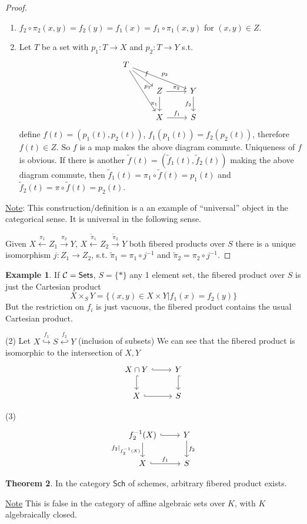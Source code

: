 \documentclass[11pt]{article}
\theoremstyle{definition}
\newtheorem{thm}{Theorem}[section]
\newtheorem{ex}[thm]{Example}
\newcommand{\calc}{{\cal C}}
\newcommand{\lrta}{\longrightarrow}
\newcommand{\inj}{\hookrightarrow}
\begin{document}
\begin{proof}
\ \begin{enumerate}[label=(\arabic*)]
\item $f_2\circ \pi_2(x,y)=f_2(y)=f_1(x)=f_1\circ \pi_1(x,y)$ for $(x,y)\in Z$.
\item Let $T$ be a set with $p_1:T\lrta X$ and $p_2:T\lrta Y$ s.t. $$\begin{tikzcd}
T \arrow[rdd,"p_1"] \arrow[rrd,"p_2"] \ar[rd,"f"] &  &  \\
 & Z \arrow[r, "\pi_2"] \arrow[d, "\pi_1"'] & Y \arrow[d, "f_2"'] \\
 & X \arrow[r, "f_1"] & S
\end{tikzcd}$$
define $f(t)=(p_1(t),p_2(t))$, $f_1(p_1(t))=f_2(p_2(t))$, therefore $f(t)\in Z$. So $f$ is a map makes the  above diagram commute. Uniqueness of $f$ is obvious. If there is  another $\tilde{f}(t)=(\tilde{f}_1(t),\tilde{f}_2(t))$ making the above diagram commute, then $\tilde{f}_1(t)=\pi_1\circ \tilde{f}(t)=p_1(t)$ and $\tilde{f}_2(t)=\pi\circ \tilde{f}(t)=p_2(t)$.
\end{enumerate}
\underline{Note}: This construction/definition is a an example of ``universal'' object in the categorical sense. It is universal in the following sense.

Given $X\overset{\pi_1}{\longleftarrow}Z_1\overset{\pi_2}{\lrta} Y$, $X\overset{\tilde{\pi}_1}{\longleftarrow}Z_2\overset{\tilde{\pi}_2}{\lrta} Y$ both fibered products over $S$ there is a unique isomorphism $j:Z_1\lrta Z_2$, s.t. $\tilde{\pi}_1=\pi_1\circ j^{-1}$ and $\tilde{\pi}_2=\pi_2\circ j^{-1}$.
\end{proof}
\begin{ex}
If $\calc=\mathsf{Sets}$, $S=\{*\}$ any 1 element set, the fibered product over $S$ is just the Cartesian product
$$
X\times_S Y=\{(x,y)\in X\times Y|f_1(x)=f_2(y)\}
$$
But the restriction on $f_i$ is just vacuous, the fibered product contains the usual Cartesian product.

(2) Let $X\overset{f_1}{\inj}S \overset{f_2}{\hookleftarrow} Y$ (inclusion of subsets) We can see that the fibered product is isomorphic to the intersection of $X,Y$
$$
\begin{tikzcd}
X\cap Y \arrow[d, hook] \arrow[r, hook] & Y \arrow[d, hook] \\
X \arrow[r, hook] & S
\end{tikzcd}
$$

(3) $$
\begin{tikzcd}
f_2^{-1}(X) \arrow[d, "f_2|_{f^{-1}_2(X)}"'] \arrow[r, hook] & Y \arrow[d, "f_2"] \\
X \arrow[r, "f_1", hook] & S
\end{tikzcd}
$$
\end{ex}
\begin{thm}
In the category $\mathsf{Sch}$ of schemes, arbitrary fibered product exists.
\end{thm}
\underline{Note} This is false in the category of affine algebraic sets over $K$, with $K$ algebraically closed.
\end{document}
